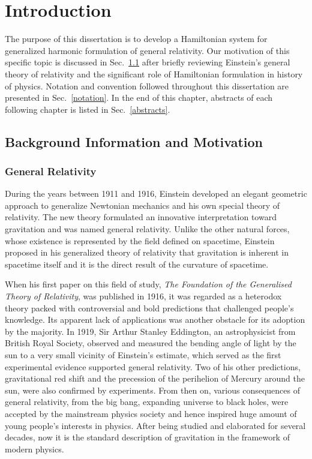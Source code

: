 \chapter{Introduction}\label{introduction}
The purpose of this dissertation is to develop a Hamiltonian system for generalized harmonic formulation of general relativity. Our motivation of this specific topic is discussed in Sec.~\ref{background} after briefly reviewing Einstein's general theory of relativity and the significant role of Hamiltonian formulation in history of physics. Notation and convention followed throughout this dissertation are presented in Sec.~\ref{notation}. In the end of this chapter, abstracts of each following chapter is listed in Sec.~\ref{abstracts}.
\section{Background Information and Motivation}\label{background}
\subsection{General Relativity}\label{gr}
During the years between 1911 and 1916, Einstein developed an elegant geometric approach to generalize Newtonian mechanics and his own special theory of relativity. The new theory formulated an innovative interpretation toward gravitation and was named general relativity. Unlike the other natural forces, whose existence is represented by the field defined on spacetime, Einstein proposed in his generalized theory of relativity that gravitation is inherent in spacetime itself and it is the direct result of the curvature of spacetime\cite[pp. 1]{carroll2003spacetime}.

When his first paper on this field of study, {\it The Foundation of the Generalised Theory of Relativity}, was published in 1916, it was regarded as a heterodox theory packed with controversial and bold predictions that challenged people's knowledge. Its apparent lack of applications was another obstacle for its adoption by the majority. In 1919, Sir Arthur Stanley Eddington, an astrophysicist from British Royal Society, observed and measured the bending angle of light by the sun to a very small vicinity of Einstein's estimate, which served as the first experimental evidence supported general relativity. Two of his other predictions, gravitational red shift and the precession of the perihelion of Mercury around the sun, were also confirmed by experiments. From then on, various consequences of general relativity, from the big bang, expanding universe to black holes, were accepted by the mainstream physics society and hence inspired huge amount of young people's interests in physics. After being studied and elaborated for several decades, now it is the standard description of gravitation in the framework of modern physics. 

